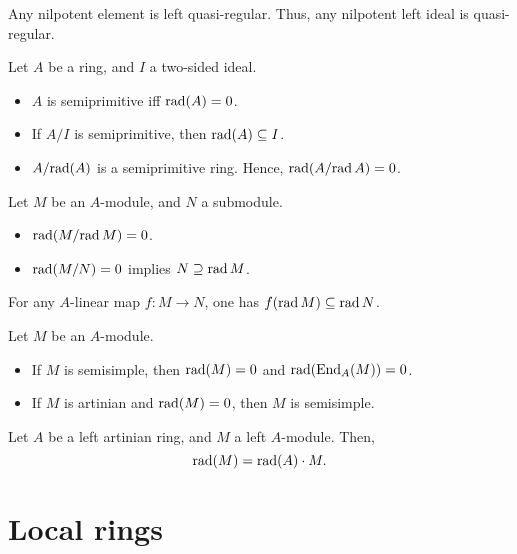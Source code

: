 \documentclass[12pt]{article}
\begin{document}
\begin{thm}
	Any nilpotent element is left quasi-regular. \newline
	Thus, any nilpotent left ideal is quasi-regular.
\end{thm}

\begin{thm} \label{thm:radical-and-semiprimitivity}
	Let $A$ be a ring, and $I$ a two-sided ideal.
	\begin{itemize}
		\item $A$ is semiprimitive iff $\operatorname{rad}(A) = 0$.
		\item If $A/I$ is semiprimitive, then $\operatorname{rad}(A) \subseteq I$.
		\item $A/{\operatorname{rad}(A)}$ is a semiprimitive ring. Hence, $\operatorname{rad}(A/{\operatorname{rad} A}) = 0$.
	\end{itemize}
\end{thm}

\begin{thm}
	Let $M$ be an $A$-module, and $N$ a submodule.
	\begin{itemize}
		\item $\operatorname{rad}(M/{\operatorname{rad} M}) = 0$.
		\item $\operatorname{rad}(M/N) = 0$ implies $N \supseteq \operatorname{rad} M$.
	\end{itemize}
\end{thm}

\begin{thm}
	For any $A$-linear map $f \colon M \to N$, one has $f(\operatorname{rad} M) \subseteq \operatorname{rad} N$.
\end{thm}

\begin{thm} \label{thm:radical-and-semisimplicity}
	Let $M$ be an $A$-module.
	\begin{itemize}
		\item If $M$ is semisimple, then $\operatorname{rad}(M) = 0$ and $\operatorname{rad}(\operatorname{End}_{A}(M)) = 0$.
		\item If $M$ is artinian and $\operatorname{rad}(M) = 0$, then $M$ is semisimple.
	\end{itemize}
\end{thm}

\begin{thm}
	Let $A$ be a left artinian ring, and $M$ a left $A$-module. 
	Then,
	\begin{equation*} 
		\operatorname{rad}(M) = \operatorname{rad}(A) \cdot M.
	\end{equation*}
\end{thm}

\section{Local rings}
\end{document}
